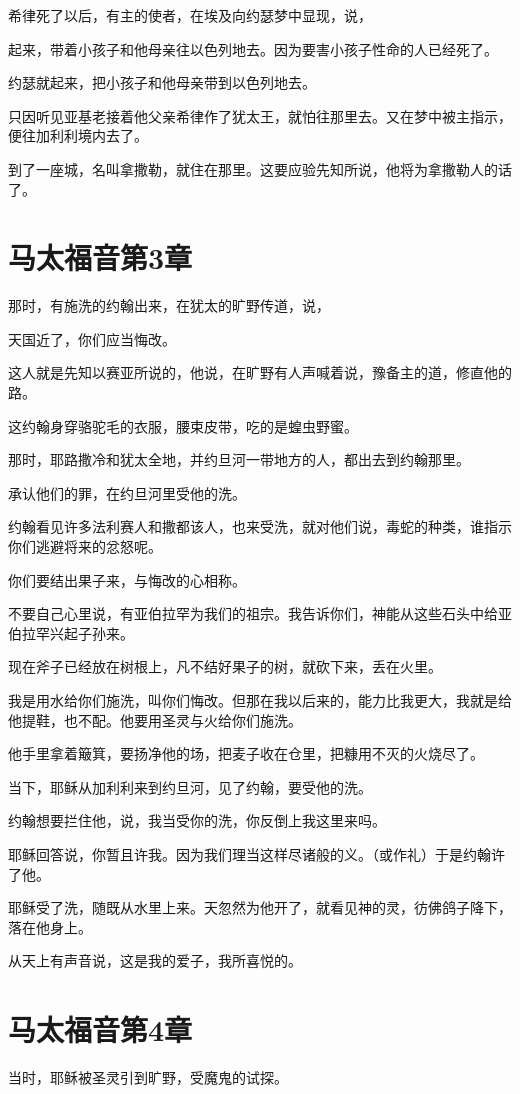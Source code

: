 \documentclass[12pt,oneside]{book}
\begin{document}
希律死了以后，有主的使者，在埃及向约瑟梦中显现，说，

起来，带着小孩子和他母亲往以色列地去。因为要害小孩子性命的人已经死了。

约瑟就起来，把小孩子和他母亲带到以色列地去。

只因听见亚基老接着他父亲希律作了犹太王，就怕往那里去。又在梦中被主指示，便往加利利境内去了。

到了一座城，名叫拿撒勒，就住在那里。这要应验先知所说，他将为拿撒勒人的话了。

\chapter{马太福音第3章}

那时，有施洗的约翰出来，在犹太的旷野传道，说，

天国近了，你们应当悔改。

这人就是先知以赛亚所说的，他说，在旷野有人声喊着说，豫备主的道，修直他的路。

这约翰身穿骆驼毛的衣服，腰束皮带，吃的是蝗虫野蜜。

那时，耶路撒冷和犹太全地，并约旦河一带地方的人，都出去到约翰那里。

承认他们的罪，在约旦河里受他的洗。

约翰看见许多法利赛人和撒都该人，也来受洗，就对他们说，毒蛇的种类，谁指示你们逃避将来的忿怒呢。

你们要结出果子来，与悔改的心相称。

不要自己心里说，有亚伯拉罕为我们的祖宗。我告诉你们，神能从这些石头中给亚伯拉罕兴起子孙来。

现在斧子已经放在树根上，凡不结好果子的树，就砍下来，丢在火里。

我是用水给你们施洗，叫你们悔改。但那在我以后来的，能力比我更大，我就是给他提鞋，也不配。他要用圣灵与火给你们施洗。

他手里拿着簸箕，要扬净他的场，把麦子收在仓里，把糠用不灭的火烧尽了。

当下，耶稣从加利利来到约旦河，见了约翰，要受他的洗。

约翰想要拦住他，说，我当受你的洗，你反倒上我这里来吗。

耶稣回答说，你暂且许我。因为我们理当这样尽诸般的义。（或作礼）于是约翰许了他。

耶稣受了洗，随既从水里上来。天忽然为他开了，就看见神的灵，彷佛鸽子降下，落在他身上。

从天上有声音说，这是我的爱子，我所喜悦的。

\chapter{马太福音第4章}
当时，耶稣被圣灵引到旷野，受魔鬼的试探。
\end{document}
